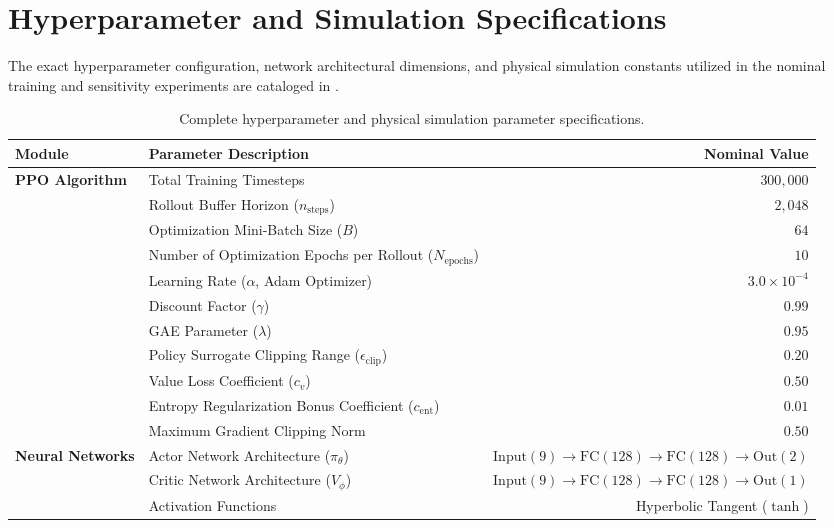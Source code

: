 \section{Hyperparameter and Simulation Specifications}
\label{app:hyperparameters}

The exact hyperparameter configuration, network architectural dimensions, and physical simulation constants utilized in the nominal training and sensitivity experiments are cataloged in .

\begin{table}[H]
    \centering
    \footnotesize
    \caption{Complete hyperparameter and physical simulation parameter specifications.}
    \label{tab:hyperparameters}
    \begin{tabularx}{\textwidth}{lXr}
        \toprule
        \textbf{Module} & \textbf{Parameter Description} & \textbf{Nominal Value} \\
        \midrule
        \multirow{8}{*}{\textbf{PPO Algorithm}} 
        & Total Training Timesteps & $300{,}000$ \\
        & Rollout Buffer Horizon ($n_{\text{steps}}$) & $2{,}048$ \\
        & Optimization Mini-Batch Size ($B$) & $64$ \\
        & Number of Optimization Epochs per Rollout ($N_{\text{epochs}}$) & $10$ \\
        & Learning Rate ($\alpha$, Adam Optimizer) & $3.0 \times 10^{-4}$ \\
        & Discount Factor ($\gamma$) & $0.99$ \\
        & GAE Parameter ($\lambda$) & $0.95$ \\
        & Policy Surrogate Clipping Range ($\epsilon_{\text{clip}}$) & $0.20$ \\
        & Value Loss Coefficient ($c_v$) & $0.50$ \\
        & Entropy Regularization Bonus Coefficient ($c_{\text{ent}}$) & $0.01$ \\
        & Maximum Gradient Clipping Norm & $0.50$ \\
        \midrule
        \multirow{4}{*}{\textbf{Neural Networks}} 
        & Actor Network Architecture ($\pi_\theta$) & $\text{Input}(9) \to \text{FC}(128) \to \text{FC}(128) \to \text{Out}(2)$ \\
        & Critic Network Architecture ($V_\phi$) & $\text{Input}(9) \to \text{FC}(128) \to \text{FC}(128) \to \text{Out}(1)$ \\
        & Activation Functions & Hyperbolic Tangent ($\tanh$) \\

\end{tabularx}
\end{table}
